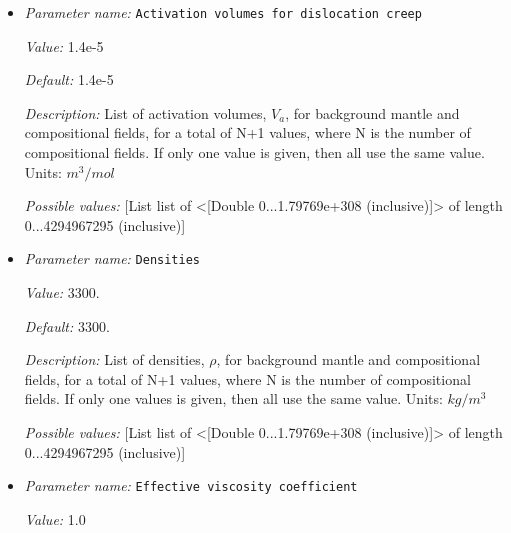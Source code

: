 \begin{itemize}
{\it Default:} 6e-6


{\it Description:} List of activation volumes, $V_a$, for background mantle and compositional fields, for a total of N+1 values, where N is the number of compositional fields. If only one value is given, then all use the same value.  Units: $m^3 / mol$


{\it Possible values:} [List list of <[Double 0...1.79769e+308 (inclusive)]> of length 0...4294967295 (inclusive)]
\item {\it Parameter name:} {\tt Activation volumes for dislocation creep}
\label{parameters:Material model/Diffusion dislocation/Activation volumes for dislocation creep}


{\it Value:} 1.4e-5


{\it Default:} 1.4e-5


{\it Description:} List of activation volumes, $V_a$, for background mantle and compositional fields, for a total of N+1 values, where N is the number of compositional fields. If only one value is given, then all use the same value.  Units: $m^3 / mol$


{\it Possible values:} [List list of <[Double 0...1.79769e+308 (inclusive)]> of length 0...4294967295 (inclusive)]
\item {\it Parameter name:} {\tt Densities}
\label{parameters:Material model/Diffusion dislocation/Densities}


{\it Value:} 3300.


{\it Default:} 3300.


{\it Description:} List of densities, $\rho$, for background mantle and compositional fields, for a total of N+1 values, where N is the number of compositional fields. If only one values is given, then all use the same value.  Units: $kg / m^3$


{\it Possible values:} [List list of <[Double 0...1.79769e+308 (inclusive)]> of length 0...4294967295 (inclusive)]
\item {\it Parameter name:} {\tt Effective viscosity coefficient}
\label{parameters:Material model/Diffusion dislocation/Effective viscosity coefficient}


{\it Value:} 1.0



\end{itemize}
